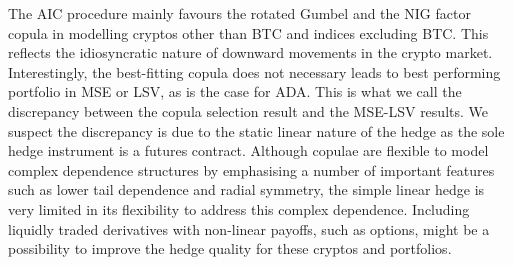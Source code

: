 The AIC procedure mainly favours the rotated Gumbel and the NIG
factor copula in modelling cryptos other than BTC and 
indices excluding BTC. This reflects the idiosyncratic nature of
downward movements in the crypto market. Interestingly, the best-fitting
copula does not necessary leads to best performing portfolio in MSE or
LSV, as is the case for ADA.
This is what we call the discrepancy between the copula selection
result and the MSE-LSV results. 
We suspect the discrepancy is due to the static linear nature of the
hedge as the sole hedge instrument is a futures contract. 
Although copulae are flexible to model complex dependence structures
by emphasising a number of important features such as lower tail
dependence and radial symmetry, the simple linear hedge is very
limited in its flexibility to address this complex dependence.
Including liquidly traded derivatives with non-linear payoffs, such as
options, might be a possibility to improve the hedge quality for these
cryptos and portfolios. 




